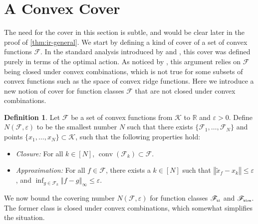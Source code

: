 \documentclass[letter, 12pt]{report}
\newcommand{\pr}{\text{\tiny\texttt{r}}}
\newcommand{\pb}{\text{\tiny\texttt{b}}}
\newcommand{\pl}{\text{\tiny\texttt{l}}}
\renewcommand{\pm}{\text{\tiny\texttt{m}}}
\newcommand{\R}{\mathbb R}
\newcommand{\norm}[1]{\left \Vert  #1 \right \Vert}
\newcommand{\cK}{\mathcal K}
\newcommand{\sF}{\mathscr F}
\newcommand{\conv}{\operatorname{conv}}
\newcommand{\1}{\mathbf{1}}
\renewcommand{\epsilon}{\varepsilon}
\theoremstyle{plain}
\theoremstyle{definition}
\newtheorem{definition}[theorem]{Definition}
\theoremstyle{remark}
\begin{document}
\section{A Convex Cover}\label{sec:cover}
The need for the cover in this section is subtle, and would be clear later in the proof of \cref{thm:ir-general}.
We start by defining a kind of cover of a set of convex functions $\sF$.
In the standard analysis introduced by \cite{BDKP15} and \cite{BE18}, this cover was defined purely in terms of the optimal action.
As noticed by \cite{lattimore2021minimax}, this argument relies on $\sF$ being closed under convex combinations, which is not true
for some subsets of convex functions such as the space of convex ridge functions.
Here we introduce a new notion of cover for function classes $\sF$ that are not closed
under convex combinations.
\begin{definition}\label{def:cover}
    Let $\sF$ be a set of convex functions from $\cK$ to $\R$ and $\epsilon > 0$.
    Define $N(\sF, \epsilon)$ to be the smallest number $N$ such that there exists $\{\sF_1,\ldots,\sF_N\}$ and points
    $\{
        x_1, \ldots, x_N
        \} \subset \cK$, such that the following properties hold:
    \begin{itemize}
        \item \textit{Closure:} For all $k \in [N]$, $\conv(\sF_k) \subset \sF$.
        \item \textit{Approximation:} For all $f \in \sF$, there exists a $k \in [N]$ such that $\norm{\tilde{x}_f - x_k} \leq \epsilon$, and $\inf_{g \in \sF_k} \norm{f - g}_\infty \leq \epsilon$.
    \end{itemize}
\end{definition}
We now bound the covering number $N(\sF, \epsilon)$ for function classes $\sF_{\pb\pl}$ and $\sF_{\pb\pl\pr\pm}$.
The former class is closed under convex combinations, which somewhat simplifies the situation.
\end{document}
